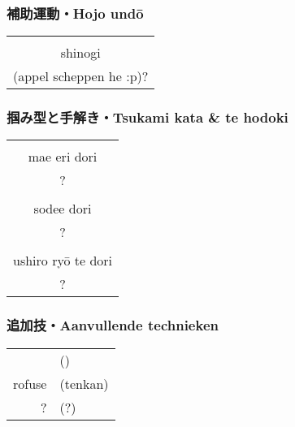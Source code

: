 \subsubsection{補助運動・Hojo und\={o}}
\begin{table}[H]
\begin{center}
\begin{tabular}{c}
    \ruby{}{}\ruby{}{}\\
    shinogi\\
    (appel scheppen he :p)?
\end{tabular}
\end{center}
\label{kyuu_4_hojo_undou}
\end{table}

\subsubsection{掴み型と手解き・Tsukami kata \& te hodoki}
\begin{table}[H]
\begin{center}
\begin{tabular}{c}
    \ruby{}{}\ruby{}{}\\
    mae eri dori\\
    ?\\
    \hline
    \ruby{}{}\\
    sodee dori\\
    ?\\
    \hline
    \ruby{}{}\\
    ushiro ry\={o} te dori\\
    ?
\end{tabular}
\end{center}
\label{kyuu_4_te_hodoki}
\end{table}

\subsubsection{追加技・Aanvullende technieken}
\begin{table}[H]
\begin{center}
\begin{tabular}{rl}
    \ruby{}{}\ruby{}{} & (\ruby{}{})\\
    rofuse & (tenkan)\\
    ? & (?)
\end{tabular}
\end{center}
\label{kyuu_4_additional}
\end{table}


